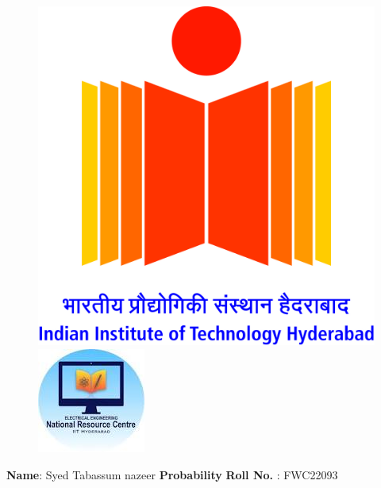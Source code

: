 \documentclass[10pt,a4paper]{report}
\begin{document}
\begin{figure}[!tbp]
\centering
\begin{minipage}[b]{0.4\textwidth}
\includegraphics[scale=0.05]{IITH-logo.jpg} 
\end{minipage}
\hfill
\vspace{5mm}\begin{minipage}[b]{0.4\textwidth}
\raggedleft \includegraphics[scale=0.6]{nrc.jpeg} 
\end{minipage}\vspace{0.2cm}
\end{figure}
\raggedright \textbf{Name}:\hspace{1mm} Syed Tabassum nazeer\hspace{3cm} \Large \textbf{Probability}\hspace{2.5cm} %
\normalsize \textbf{Roll No.} :\hspace{1mm} FWC22093\vspace{0.5cm}\\
\end{document}
